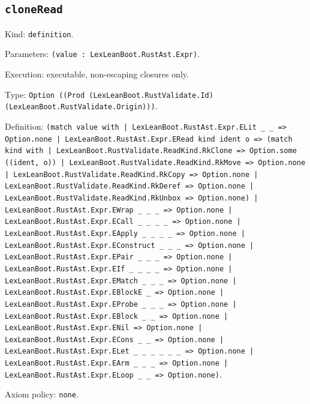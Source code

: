 \documentclass[11pt]{article}
\begin{document}
\subsection*{\texttt{cloneRead}}
\noindent Kind: \texttt{definition}.\par
\noindent Parameters: \texttt{(value : LexLeanBoot.RustAst.Expr)}.\par
\noindent Execution: executable, non-escaping closures only.\par
\noindent Type: \texttt{Option ((Prod (LexLeanBoot.RustValidate.Id) (LexLeanBoot.RustValidate.Origin)))}.\par
\noindent Definition: \texttt{(match value with | LexLeanBoot.RustAst.Expr.ELit \_ \_ => Option.none | LexLeanBoot.RustAst.Expr.ERead kind ident o => (match kind with | LexLeanBoot.RustValidate.ReadKind.RkClone => Option.some ((ident, o)) | LexLeanBoot.RustValidate.ReadKind.RkMove => Option.none | LexLeanBoot.RustValidate.ReadKind.RkCopy => Option.none | LexLeanBoot.RustValidate.ReadKind.RkDeref => Option.none | LexLeanBoot.RustValidate.ReadKind.RkUnbox => Option.none) | LexLeanBoot.RustAst.Expr.EWrap \_ \_ \_ => Option.none | LexLeanBoot.RustAst.Expr.ECall \_ \_ \_ \_ => Option.none | LexLeanBoot.RustAst.Expr.EApply \_ \_ \_ \_ => Option.none | LexLeanBoot.RustAst.Expr.EConstruct \_ \_ \_ => Option.none | LexLeanBoot.RustAst.Expr.EPair \_ \_ \_ => Option.none | LexLeanBoot.RustAst.Expr.EIf \_ \_ \_ \_ => Option.none | LexLeanBoot.RustAst.Expr.EMatch \_ \_ \_ => Option.none | LexLeanBoot.RustAst.Expr.EBlockE \_ => Option.none | LexLeanBoot.RustAst.Expr.EProbe \_ \_ \_ => Option.none | LexLeanBoot.RustAst.Expr.EBlock \_ \_ => Option.none | LexLeanBoot.RustAst.Expr.ENil => Option.none | LexLeanBoot.RustAst.Expr.ECons \_ \_ => Option.none | LexLeanBoot.RustAst.Expr.ELet \_ \_ \_ \_ \_ \_ => Option.none | LexLeanBoot.RustAst.Expr.EArm \_ \_ \_ => Option.none | LexLeanBoot.RustAst.Expr.ELoop \_ \_ => Option.none)}.\par
\noindent Axiom policy: \texttt{none}.\par
\end{document}

